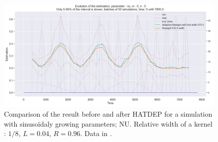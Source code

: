 \begin{figure}
\centering
\includegraphics[width = 0.90 \textwidth]{../imag/chap3/4_bis/R.png}
\caption{Comparison of the result before and after HATDEP for a simulation with sinusoïdaly growing parameters; NU. Relative width of a kernel : $1/8$, $L = 0.04$, $R = 0.96$. Data in \protect {}.}
\label{fig:second_estimate_4_nu}
\end{figure}









